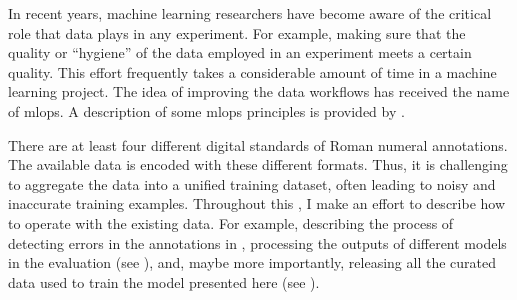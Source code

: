 

In recent years, machine learning researchers have become
aware of the critical role that data plays in any
experiment. For example, making sure that the quality or
``hygiene'' of the data employed in an experiment meets a
certain quality. This effort frequently takes a considerable
amount of time in a machine learning project. The idea of
improving the data workflows has received the name of
\gls{mlops}. A description of some \gls{mlops} principles is
provided by \textcite{renggli2021data}.

There are at least four different digital standards of Roman
numeral annotations. The available data is encoded with
these different formats. Thus, it is challenging to
aggregate the data into a unified training dataset, often
leading to noisy and inaccurate training examples.
Throughout this \thesisdiss{}, I make an effort to describe
how to operate with the existing data. For example,
describing the process of detecting errors in the
annotations in ,
processing the outputs of different models in the evaluation
(see ), and, maybe more
importantly, releasing all the curated data used to train
the model presented here (see ).
